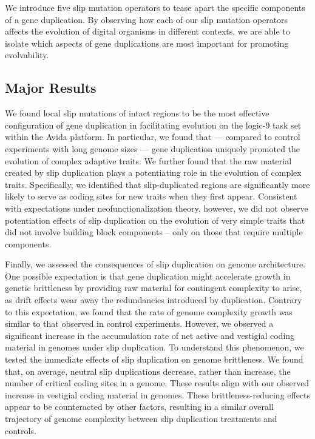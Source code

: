 We introduce five slip mutation operators to tease apart the specific components of a gene duplication.
By observing how each of our slip mutation operators affects the evolution of digital organisms in different contexts, we are able to isolate which aspects of gene duplications are most important for promoting evolvability.

\subsection{Major Results}

We found local slip mutations of intact regions to be the most effective configuration of gene duplication in facilitating evolution on the logic-9 task set within the Avida platform.
In particular, we found that --- compared to control experiments with long genome sizes --- gene duplication uniquely promoted the evolution of complex adaptive traits.
We further found that the raw material created by slip duplication plays a potentiating role in the evolution of complex traits.
Specifically, we identified that slip-duplicated regions are significantly more likely to serve as coding sites for new traits when they first appear.
Consistent with expectations under neofunctionalization theory, however, we did not observe potentiation effects of slip duplication on the evolution of very simple traits that did not involve building block components -- only on those that require multiple components.

Finally, we assessed the consequences of slip duplication on genome architecture.
One possible expectation is that gene duplication might accelerate growth in genetic brittleness by providing raw material for contingent complexity to arise, as drift effects wear away the redundancies introduced by duplication.
Contrary to this expectation, we found that the rate of genome complexity growth was similar to that observed in control experiments.
However, we observed a significant increase in the accumulation rate of net active and vestigial coding material in genomes under slip duplication.
To understand this phenomenon, we tested the immediate effects of slip duplication on genome brittleness.
We found that, on average, neutral slip duplications decrease, rather than increase, the number of critical coding sites in a genome.
These results align with our observed increase in vestigial coding material in genomes.
These brittleness-reducing effects appear to be counteracted by other factors, resulting in a similar overall trajectory of genome complexity between slip duplication treatments and controls.
